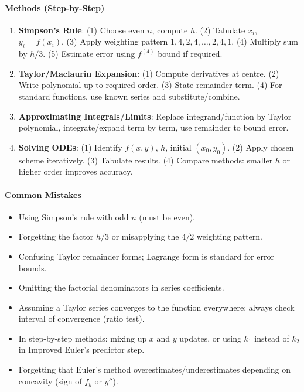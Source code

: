 \documentclass[11pt]{article}
\begin{document}
\begin{bilan}
\paragraph{Methods (Step-by-Step)}
\begin{enumerate}
    \item \textbf{Simpson's Rule}: (1) Choose even $n$, compute $h$. (2) Tabulate $x_i$, $y_i=f(x_i)$. (3) Apply weighting pattern $1,4,2,4,\dots,2,4,1$. (4) Multiply sum by $h/3$. (5) Estimate error using $f^{(4)}$ bound if required.
    \item \textbf{Taylor/Maclaurin Expansion}: (1) Compute derivatives at centre. (2) Write polynomial up to required order. (3) State remainder term. (4) For standard functions, use known series and substitute/combine.
    \item \textbf{Approximating Integrals/Limits}: Replace integrand/function by Taylor polynomial, integrate/expand term by term, use remainder to bound error.
    \item \textbf{Solving ODEs}: (1) Identify $f(x,y)$, $h$, initial $(x_0,y_0)$. (2) Apply chosen scheme iteratively. (3) Tabulate results. (4) Compare methods: smaller $h$ or higher order improves accuracy.
\end{enumerate}

\paragraph{Common Mistakes}
\begin{itemize}
    \item Using Simpson's rule with odd $n$ (must be even).
    \item Forgetting the factor $h/3$ or misapplying the $4/2$ weighting pattern.
    \item Confusing Taylor remainder forms; Lagrange form is standard for error bounds.
    \item Omitting the factorial denominators in series coefficients.
    \item Assuming a Taylor series converges to the function everywhere; always check interval of convergence (ratio test).
    \item In step-by-step methods: mixing up $x$ and $y$ updates, or using $k_1$ instead of $k_2$ in Improved Euler's predictor step.
    \item Forgetting that Euler's method overestimates/underestimates depending on concavity (sign of $f_y$ or $y''$).
\end{itemize}


\end{bilan}
\end{document}
